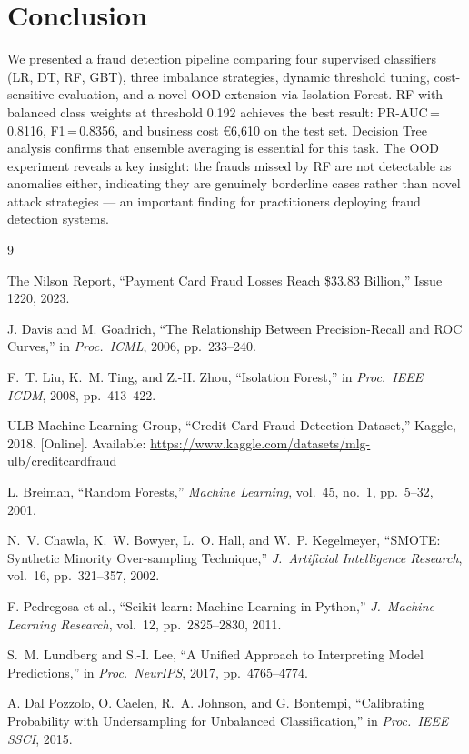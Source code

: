 \documentclass[conference]{IEEEtran}
\begin{document}
\section{Conclusion}

We presented a fraud detection pipeline comparing four supervised classifiers
(LR, DT, RF, GBT), three imbalance strategies, dynamic threshold tuning,
cost-sensitive evaluation, and a novel OOD extension via Isolation Forest.
RF with balanced class weights at threshold 0.192 achieves the best result:
PR-AUC\,=\,0.8116, F1\,=\,0.8356, and business cost \euro6,610 on the test set.
Decision Tree analysis confirms that ensemble averaging is essential for this
task. The OOD experiment reveals a key insight: the frauds missed by RF are
not detectable as anomalies either, indicating they are genuinely borderline
cases rather than novel attack strategies --- an important finding for
practitioners deploying fraud detection systems.

\begin{thebibliography}{9}

  The Nilson Report,
  ``Payment Card Fraud Losses Reach \$33.83 Billion,''
  Issue 1220, 2023.

  J. Davis and M. Goadrich,
  ``The Relationship Between Precision-Recall and ROC Curves,''
  in \textit{Proc.\ ICML}, 2006, pp.\ 233--240.

  F.~T. Liu, K.~M. Ting, and Z.-H. Zhou,
  ``Isolation Forest,''
  in \textit{Proc.\ IEEE ICDM}, 2008, pp.\ 413--422.

  ULB Machine Learning Group,
  ``Credit Card Fraud Detection Dataset,''
  Kaggle, 2018.
  [Online]. Available: \url{https://www.kaggle.com/datasets/mlg-ulb/creditcardfraud}

  L. Breiman,
  ``Random Forests,''
  \textit{Machine Learning}, vol.\ 45, no.\ 1, pp.\ 5--32, 2001.

  N.~V. Chawla, K.~W. Bowyer, L.~O. Hall, and W.~P. Kegelmeyer,
  ``SMOTE: Synthetic Minority Over-sampling Technique,''
  \textit{J.\ Artificial Intelligence Research}, vol.\ 16, pp.\ 321--357, 2002.

  F. Pedregosa et al.,
  ``Scikit-learn: Machine Learning in Python,''
  \textit{J.\ Machine Learning Research}, vol.\ 12, pp.\ 2825--2830, 2011.

  S.~M. Lundberg and S.-I. Lee,
  ``A Unified Approach to Interpreting Model Predictions,''
  in \textit{Proc.\ NeurIPS}, 2017, pp.\ 4765--4774.

  A. Dal Pozzolo, O. Caelen, R.~A. Johnson, and G. Bontempi,
  ``Calibrating Probability with Undersampling for Unbalanced Classification,''
  in \textit{Proc.\ IEEE SSCI}, 2015.

\end{thebibliography}
\end{document}
